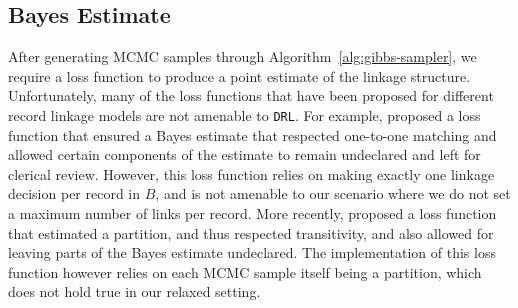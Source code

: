 \documentclass[12pt,letterpaper]{article}
\newcommand{\1}[1]{\mathbb{I}\!\left[#1\right]} %
\begin{document}
\subsection{Bayes Estimate}\label{sec:bayes-estimate} 

After generating MCMC samples through Algorithm~\ref{alg:gibbs-sampler}, we require a loss function to produce a point estimate of the linkage structure. Unfortunately, many of the loss functions that have been proposed for different record linkage models are not amenable to \texttt{DRL}. For example, \cite{sadinle_bayesian_2017} proposed a loss function that ensured a Bayes estimate that respected one-to-one matching and allowed certain components of the estimate to remain undeclared and left for clerical review. However, this loss function relies on making exactly one linkage decision per record in $B$, and is not amenable to our scenario where we do not set a maximum number of links per record. More recently, \cite{aleshin2023multifile} proposed a loss function that estimated a partition, and thus respected transitivity, and also allowed for leaving parts of the Bayes estimate undeclared. The implementation of this loss function however relies on each MCMC sample itself being a partition, which does not hold true in our relaxed setting. 
\end{document}
